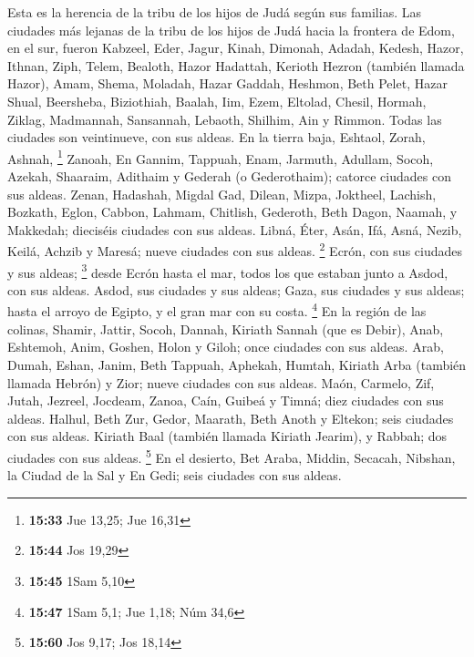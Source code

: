 \begin{paracol}{2}
 Esta es la herencia de la tribu de los hijos de Judá
según sus familias.  Las ciudades más lejanas de la tribu
de los hijos de Judá hacia la frontera de Edom, en el sur, fueron
Kabzeel, Eder, Jagur,  Kinah, Dimonah, Adadah,
 Kedesh, Hazor, Ithnan,  Ziph, Telem,
Bealoth,  Hazor Hadattah, Kerioth Hezron (también llamada
Hazor),  Amam, Shema, Moladah,  Hazar
Gaddah, Heshmon, Beth Pelet,  Hazar Shual, Beersheba,
Biziothiah,  Baalah, Iim, Ezem,  Eltolad,
Chesil, Hormah,  Ziklag, Madmannah, Sansannah,
 Lebaoth, Shilhim, Ain y Rimmon. Todas las ciudades son
veintinueve, con sus aldeas.  En la tierra baja, Eshtaol,
Zorah, Ashnah, \footnote{\textbf{15:33} Jue 13,25; Jue 16,31}
 Zanoah, En Gannim, Tappuah, Enam, 
Jarmuth, Adullam, Socoh, Azekah,  Shaaraim, Adithaim y
Gederah (o Gederothaim); catorce ciudades con sus aldeas.
 Zenan, Hadashah, Migdal Gad,  Dilean,
Mizpa, Joktheel,  Lachish, Bozkath, Eglon,
 Cabbon, Lahmam, Chitlish,  Gederoth, Beth
Dagon, Naamah, y Makkedah; dieciséis ciudades con sus aldeas.
 Libná, Éter, Asán,  Ifá, Asná, Nezib,
 Keilá, Achzib y Maresá; nueve ciudades con sus aldeas.
\footnote{\textbf{15:44} Jos 19,29}  Ecrón, con sus
ciudades y sus aldeas; \footnote{\textbf{15:45} 1Sam 5,10}
 desde Ecrón hasta el mar, todos los que estaban junto a
Asdod, con sus aldeas.  Asdod, sus ciudades y sus aldeas;
Gaza, sus ciudades y sus aldeas; hasta el arroyo de Egipto, y el gran
mar con su costa. \footnote{\textbf{15:47} 1Sam 5,1; Jue 1,18; Núm 34,6}
 En la región de las colinas, Shamir, Jattir, Socoh,
 Dannah, Kiriath Sannah (que es Debir), 
Anab, Eshtemoh, Anim,  Goshen, Holon y Giloh; once
ciudades con sus aldeas.  Arab, Dumah, Eshan,
 Janim, Beth Tappuah, Aphekah,  Humtah,
Kiriath Arba (también llamada Hebrón) y Zior; nueve ciudades con sus
aldeas.  Maón, Carmelo, Zif, Jutah, 
Jezreel, Jocdeam, Zanoa,  Caín, Guibeá y Timná; diez
ciudades con sus aldeas.  Halhul, Beth Zur, Gedor,
 Maarath, Beth Anoth y Eltekon; seis ciudades con sus
aldeas.  Kiriath Baal (también llamada Kiriath Jearim), y
Rabbah; dos ciudades con sus aldeas. \footnote{\textbf{15:60} Jos 9,17;
  Jos 18,14}  En el desierto, Bet Araba, Middin, Secacah,
 Nibshan, la Ciudad de la Sal y En Gedi; seis ciudades
con sus aldeas.


\end{paracol}
